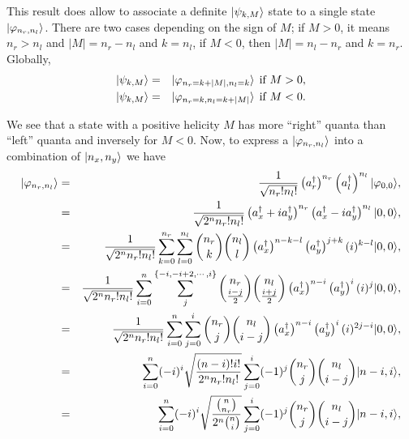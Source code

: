 This result does allow to associate a definite $| \psi_{k,M} \rangle$ state to a single state $| \varphi_{n_r,n_l} \rangle$. There are two cases depending on the sign of $M$; if $M>0$, it means $n_r>n_l$ and $|M|=n_r-n_l$ and $k=n_l$, if $M<0$, then $|M|=n_l-n_r$ and $k=n_r$. Globally,
\begin{eqnarray}
    | \psi_{k,M} \rangle &=& | \varphi_{n_r=k+|M|,n_l=k} \rangle \:\: \textrm{if } M>0, \\
    | \psi_{k,M} \rangle &=& | \varphi_{n_r=k,n_l=k+|M|} \rangle \:\: \textrm{if } M<0.
\end{eqnarray}

We see that a state with a positive helicity $M$ has more ``right'' quanta than ``left'' quanta and inversely for $M<0$. Now, to express a $| \varphi_{n_r,n_l} \rangle$ into a combination of $| n_x,n_y \rangle$ we have
\begin{eqnarray}
    | \varphi_{n_r,n_l} \rangle&=& \frac{1}{\sqrt{n_r! n_l!}} \left( a_r^\dagger \right)^{n_r}  \left( a_l^\dagger \right)^{n_l} | \varphi_{0,0} \rangle, \\
    &=&   \frac{1}{\sqrt{2^n n_r! n_l!}} \left( a_x^\dagger +ia_y^\dagger \right)^{n_r}  \left( a_x^\dagger -ia_y^\dagger\right)^{n_l} | 0,0 \rangle, \label{eq-2D2}\\
    &=&   \frac{1}{\sqrt{2^n n_r! n_l!}} \sum_{k=0}^{n_r} \sum_{l=0}^{n_l}  \binom{n_r}{k} \binom{n_l}{l} \left( a_x^\dagger \right)^{n-k-l}  \left(a_y^\dagger \right)^{j+k} (i)^{k-l} | 0,0 \rangle, \label{eq-2D3}\\
    &=&   \frac{1}{\sqrt{2^n n_r! n_l!}} \sum_{i=0}^{n} \sum_{j}^{\{-i,-i+2,\cdots, i\}}  \binom{n_r}{\frac{i-j}{2}} \binom{n_l}{\frac{i+j}{2}} \left( a_x^\dagger \right)^{n-i}  \left(a_y^\dagger \right)^i (i)^{j} | 0,0 \rangle, \label{eq-2D4}\\
    &=&   \frac{1}{\sqrt{2^n n_r! n_l!}} \sum_{i=0}^{n} \sum_{j=0}^{i}  \binom{n_r}{j} \binom{n_l}{i-j} \left( a_x^\dagger \right)^{n-i}  \left(a_y^\dagger \right)^i (i)^{2j-i} | 0,0 \rangle,\label{eq-2D5} \\
    &=&   \sum_{i=0}^{n}(-i)^i  \sqrt{ \frac{(n-i)! i!}{2^n n_r! n_l!}}    \sum_{j=0}^{i} (-1)^j \binom{n_r}{j} \binom{n_l}{i-j}  | n-i,i \rangle,\label{eq-2D6} \\
    &=&   \sum_{i=0}^{n}(-i)^i  \sqrt{\frac{\binom{n}{n_r} }{2^n \binom{n}{i}}}    \sum_{j=0}^{i}(-1)^j \binom{n_r}{j} \binom{n_l}{i-j}  | n-i,i \rangle, \label{eq-2D7}
\end{eqnarray}
